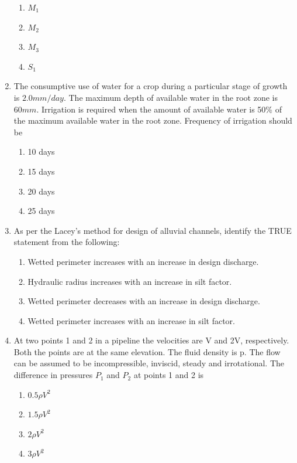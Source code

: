 \documentclass[journal,12pt,onecolumn]{IEEEtran}
\theoremstyle{remark}
\begin{document}
\begin{enumerate}
\hfill{}
\begin{enumerate}
\item $M_1$
\item $M_2$
\item $M_3$
\item $S_1$
\end{enumerate}

\item The consumptive use of water for a crop during a particular stage of growth is $2.0 mm/day$. The maximum depth of available water in the root zone is $60 mm$. Irrigation is required when the amount of available water is 50\% of the maximum available water in the root zone. Frequency of irrigation should be

\hfill{}
\begin{enumerate}
\item 10 days
\item 15 days
\item 20 days
\item 25 days
\end{enumerate}

\item As per the Lacey's method for design of alluvial channels, identify the TRUE statement from the following:

\hfill{}
\begin{enumerate}
\item Wetted perimeter increases with an increase in design discharge.
\item Hydraulic radius increases with an increase in silt factor.
\item Wetted perimeter decreases with an increase in design discharge.
\item Wetted perimeter increases with an increase in silt factor.
\end{enumerate}

\item At two points 1 and 2 in a pipeline the velocities are V and 2V, respectively. Both the points are at the same elevation. The fluid density is p. The flow can be assumed to be incompressible, inviscid, steady and irrotational. The difference in pressures $P_1$ and $P_2$ at points 1 and 2 is

\hfill{}
\begin{enumerate}
\item $0.5\rho V^2$
\item $1.5\rho V^2$
\item $2\rho V^2$
\item $3\rho V^2$
\end{enumerate}


\end{enumerate}
\end{document}
